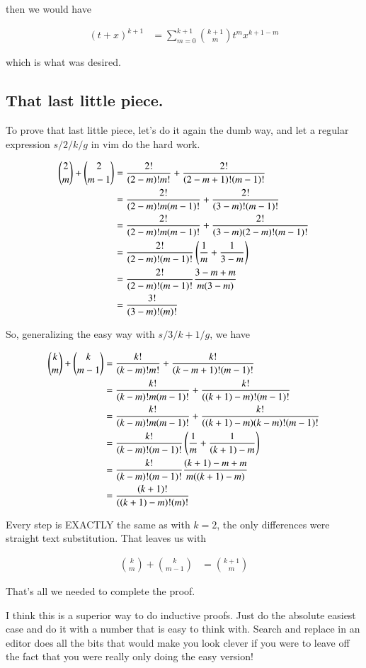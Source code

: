 \documentclass{article}
\begin{document}
then we would have

\begin{align*}
(t + x)^{k+1}
&= \sum_{m=0}^{k+1} \binom{k+1}{m} t^{m} x^{k + 1 - m} 
\end{align*}

which is what was desired.

\subsection{ That last little piece. }

To prove that last little piece, let's do it again the dumb way, and let a regular expression $s/2/k/g$ in vim do the hard work.

\begin{align*}
\binom{2}{m} + \binom{2}{m-1} 
&=
\frac{2!}{(2-m)!m!}
+ \frac{2!}{(2-m + 1)!(m-1)!} \\
&=
\frac{2!}{(2-m)!m(m-1)!}
+ \frac{2!}{(3-m)!(m-1)!} \\
&=
\frac{2!}{(2-m)!m(m-1)!}
+ \frac{2!}{(3-m)(2-m)!(m-1)!} \\
&=
\frac{2!}{(2-m)!(m-1)!} \left( \frac{1}{m} + \frac{1}{3-m}\right) \\
&=
\frac{2!}{(2-m)!(m-1)!} \frac{3 -m + m }{m(3-m)} \\
&=
\frac{3!}{(3-m)!(m)!} \\
\end{align*}

So, generalizing the easy way with $s/3/k+1/g$, we have 

\begin{align*}
\binom{k}{m} + \binom{k}{m-1} 
&=
\frac{k!}{(k-m)!m!}
+ \frac{k!}{(k-m + 1)!(m-1)!} \\
&=
\frac{k!}{(k-m)!m(m-1)!}
+ \frac{k!}{((k+1)-m)!(m-1)!} \\
&=
\frac{k!}{(k-m)!m(m-1)!}
+ \frac{k!}{((k+1)-m)(k-m)!(m-1)!} \\
&=
\frac{k!}{(k-m)!(m-1)!} \left( \frac{1}{m} + \frac{1}{(k+1)-m}\right) \\
&=
\frac{k!}{(k-m)!(m-1)!} \frac{(k+1) -m + m }{m((k+1)-m)} \\
&=
\frac{(k+1)!}{((k+1)-m)!(m)!} \\
\end{align*}

Every step is EXACTLY the same as with $k=2$, the only differences were straight text substitution.  That leaves us with

\begin{align}
\binom{k}{m} + \binom{k}{m-1} 
&=
\binom{k+1}{m}
\end{align}

That's all we needed to complete the proof.

I think this is a superior way to do inductive proofs.  Just do the absolute easiest case and do it with a number that is easy to think with.  Search and replace in an editor does all the bits that would make you look clever if you were to leave off the fact that you were really only doing the easy version!

%
%
\end{document}

